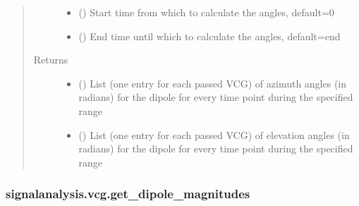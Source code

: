 \documentclass[letterpaper,10pt,english]{sphinxmanual}
\begin{document}
\begin{fulllineitems}
\begin{quote}
\begin{description}
\begin{itemize}
\item {} 
\sphinxAtStartPar
{} (\sphinxstyleliteralemphasis{\sphinxupquote{, }}) \textendash{} Start time from which to calculate the angles, default=0

\item {} 
\sphinxAtStartPar
{} (\sphinxstyleliteralemphasis{\sphinxupquote{, }}) \textendash{} End time until which to calculate the angles, default=end

\end{itemize}

\item[{Returns}] \leavevmode
\sphinxAtStartPar
\begin{itemize}
\item {} 
\sphinxAtStartPar
{} () \textendash{} List (one entry for each passed VCG) of azimuth angles (in radians) for the dipole for every time point during
the specified range

\item {} 
\sphinxAtStartPar
{} () \textendash{} List (one entry for each passed VCG) of elevation angles (in radians) for the dipole for every time point during
the specified range

\end{itemize}


\end{description}\end{quote}

\end{fulllineitems}



\subsubsection{signalanalysis.vcg.get\_dipole\_magnitudes}
\label{\detokenize{_autosummary/signalanalysis.vcg.get_dipole_magnitudes:signalanalysis-vcg-get-dipole-magnitudes}}\label{\detokenize{_autosummary/signalanalysis.vcg.get_dipole_magnitudes::doc}}
\end{document}
